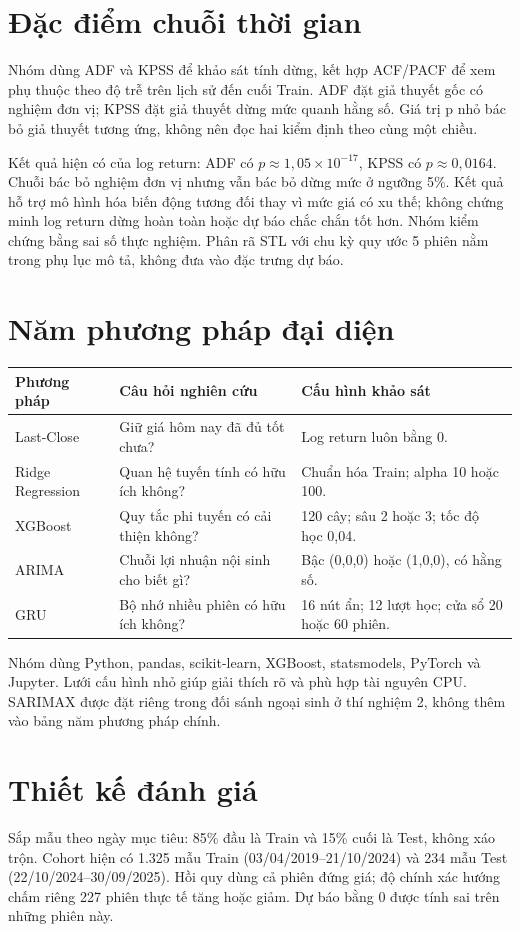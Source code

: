 \documentclass[12pt,a4paper]{article}
\begin{document}
\section{Đặc điểm chuỗi thời gian}
Nhóm dùng ADF và KPSS để khảo sát tính dừng, kết hợp ACF/PACF để xem phụ thuộc theo độ trễ trên lịch sử đến cuối Train. ADF đặt giả thuyết gốc có nghiệm đơn vị; KPSS đặt giả thuyết dừng mức quanh hằng số. Giá trị p nhỏ bác bỏ giả thuyết tương ứng, không nên đọc hai kiểm định theo cùng một chiều.

Kết quả hiện có của log return: ADF có $p\approx1{,}05\times10^{-17}$, KPSS có $p\approx0{,}0164$. Chuỗi bác bỏ nghiệm đơn vị nhưng vẫn bác bỏ dừng mức ở ngưỡng 5\%. Kết quả hỗ trợ mô hình hóa biến động tương đối thay vì mức giá có xu thế; không chứng minh log return dừng hoàn toàn hoặc dự báo chắc chắn tốt hơn. Nhóm kiểm chứng bằng sai số thực nghiệm. Phân rã STL với chu kỳ quy ước 5 phiên nằm trong phụ lục mô tả, không đưa vào đặc trưng dự báo.

\newpage
\section{Năm phương pháp đại diện}
{\small\renewcommand{\arraystretch}{1.2}
\begin{tabularx}{\textwidth}{@{}p{3.0cm}YY@{}}
\toprule
\textbf{Phương pháp} & \textbf{Câu hỏi nghiên cứu} & \textbf{Cấu hình khảo sát}\\\midrule
Last-Close & Giữ giá hôm nay đã đủ tốt chưa? & Log return luôn bằng 0.\\
Ridge Regression & Quan hệ tuyến tính có hữu ích không? & Chuẩn hóa Train; alpha 10 hoặc 100.\\
XGBoost & Quy tắc phi tuyến có cải thiện không? & 120 cây; sâu 2 hoặc 3; tốc độ học 0,04.\\
ARIMA & Chuỗi lợi nhuận nội sinh cho biết gì? & Bậc (0,0,0) hoặc (1,0,0), có hằng số.\\
GRU & Bộ nhớ nhiều phiên có hữu ích không? & 16 nút ẩn; 12 lượt học; cửa sổ 20 hoặc 60 phiên.\\
\bottomrule
\end{tabularx}}

Nhóm dùng Python, pandas, scikit-learn, XGBoost, statsmodels, PyTorch và Jupyter. Lưới cấu hình nhỏ giúp giải thích rõ và phù hợp tài nguyên CPU. SARIMAX được đặt riêng trong đối sánh ngoại sinh ở thí nghiệm 2, không thêm vào bảng năm phương pháp chính.

\section{Thiết kế đánh giá}
Sắp mẫu theo ngày mục tiêu: 85\% đầu là Train và 15\% cuối là Test, không xáo trộn. Cohort hiện có 1.325 mẫu Train (03/04/2019--21/10/2024) và 234 mẫu Test (22/10/2024--30/09/2025). Hồi quy dùng cả phiên đứng giá; độ chính xác hướng chấm riêng 227 phiên thực tế tăng hoặc giảm. Dự báo bằng 0 được tính sai trên những phiên này.
\end{document}
